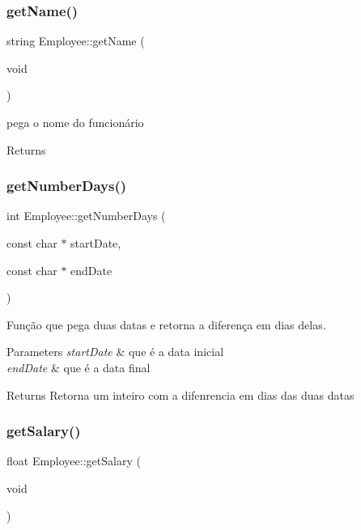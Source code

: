 \subsubsection{\texorpdfstring{get\+Name()}{getName()}}
{\footnotesize\ttfamily string Employee\+::get\+Name (\begin{DoxyParamCaption}\item[{void}]{ }\end{DoxyParamCaption})}



pega o nome do funcionário 

\begin{DoxyReturn}{Returns}

\end{DoxyReturn}
\mbox{\label{classEmployee_ad574b1f31281cc974c9020418a040f0a}} 
\subsubsection{\texorpdfstring{get\+Number\+Days()}{getNumberDays()}}
{\footnotesize\ttfamily int Employee\+::get\+Number\+Days (\begin{DoxyParamCaption}\item[{const char $\ast$}]{start\+Date,  }\item[{const char $\ast$}]{end\+Date }\end{DoxyParamCaption})}



Função que pega duas datas e retorna a diferença em dias delas. 


\begin{DoxyParams}{Parameters}
{\em start\+Date} & que é a data inicial \\
\hline
{\em end\+Date} & que é a data final \\
\hline
\end{DoxyParams}
\begin{DoxyReturn}{Returns}
Retorna um inteiro com a difenrencia em dias das duas datas 
\end{DoxyReturn}
\mbox{\label{classEmployee_a5d4eef7887d1e7746858f324869c8452}} 
\subsubsection{\texorpdfstring{get\+Salary()}{getSalary()}}
{\footnotesize\ttfamily float Employee\+::get\+Salary (\begin{DoxyParamCaption}\item[{void}]{ }\end{DoxyParamCaption})}



